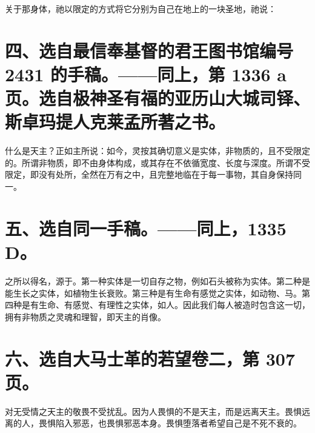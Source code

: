 关于那身体，祂以限定的方式将它分别为自己在地上的一块圣地，祂说：\par


\section{四、选自最信奉基督的君王图书馆编号 2431 的手稿。——同上，第 1336 a 页。选自极神圣有福的亚历山大城司铎、斯卓玛提人克莱孟所著之书。}

什么是天主？正如主所说：如今，灵按其确切意义是实体，非物质的，且不受限定的。所谓非物质，即不由身体构成，或其存在不依循宽度、长度与深度。所谓不受限定，即没有处所，全然在万有之中，且完整地临在于每一事物，其自身保持同一。\par


\section{五、选自同一手稿。——同上，1335 D。}

之所以得名，源于。第一种实体是一切自存之物，例如石头被称为实体。第二种是能生长之实体，如植物生长衰败。第三种是有生命有感觉之实体，如动物、马。第四种是有生命、有感觉、有理性之实体，如人。因此我们每人被造时包含这一切，拥有非物质之灵魂和理智，即天主的肖像。\par


\section{六、选自大马士革的若望卷二，第 307 页。}

对无受情之天主的敬畏不受扰乱。因为人畏惧的不是天主，而是远离天主。畏惧远离的人，畏惧陷入邪恶，也畏惧邪恶本身。畏惧堕落者希望自己是不死不衰的。\par


